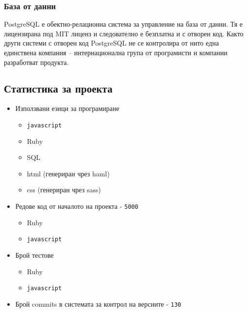 \documentclass[a4paper]{article}
\def\js{\texttt{javascript}}
\begin{document}
  \subsubsection{База от данни}
  PostgreSQL \cite{postgresql} е обектно-релационна система за управление на база от данни. Тя е лицензирана под MIT лиценз и следователно е безплатна и с отворен код. Както други системи с отворен код PostgreSQL не се контролира от нито една единствена компания -- интернационална група от програмисти и компании разработват продукта.

  \subsection{Статистика за проекта}
  \begin{itemize}
    \item Използвани езици за програмиране
    \begin{itemize}
      \item \js
      \item Ruby
      \item SQL
      \item html (генериран чрез haml)
      \item css (генериран чрез sass)
    \end{itemize}
    
    \item Редове код от началото на проекта - \texttt{5000}
    \begin{itemize}
      \item Ruby 
      \item \js {}
    \end{itemize}


    \item Брой тестове
    \begin{itemize}
      \item Ruby 
      \item \js {}
    \end{itemize}

    \item Брой commits в системата за контрол на версиите - \texttt{130}
  \end{itemize}
\end{document}
